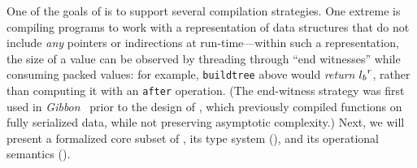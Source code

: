 \documentclass[showabstract,showacknowledgments,showpreface,showdedication]{iuphd}
\theoremstyle{nonumberplain}
\begin{document}
%

{One of the goals of \ourcalc{} is to support several compilation
  strategies. One extreme is compiling programs to work with a representation of
  data structures that do not include \emph{any} pointers or indirections at
  run-time---within such a representation, the size of a value can be observed
  by threading through ``end witnesses'' while consuming packed values: for
  example, \lstinline[mathescape]{buildtree} above would \emph{return} ${l_b}^{r}$, rather than computing
  it with an \lstinline[mathescape]{after} operation.
  (The end-witness strategy was first used in
  {\em Gibbon}~\cite{ecoop17-gibbon} prior to the design of \ourcalc{},
  which previously compiled functions on fully serialized data,
  while not preserving asymptotic complexity.)
}
%
%
%
%
Next, we will present a formalized core subset of \ourcalc, 
its type system (),
and its operational semantics ().
\end{document}
